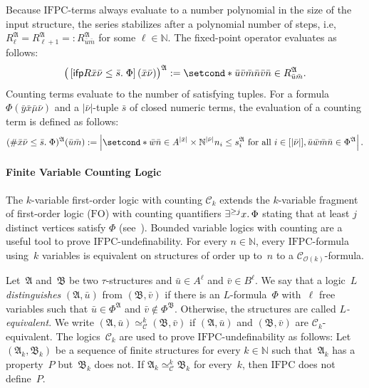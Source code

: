 \documentclass[]{lmcs}
\newcommand{\nat}{\mathbb{N}}
\newcommand{\defining}[1]{\emph{#1}}
\newcommand{\qspace}{\mathchoice{\;}{\,}{}{}}
\newcommand{\numVarA}{\nu}
\newcommand{\numVarB}{\mu}
\newcommand{\uniVarA}{x}
\newcommand{\uniVarB}{y}
\newcommand{\varVec}[1]{\bar{#1}}
\newcommand{\numVarVA}{\varVec{\numVarA}}
\newcommand{\numVarVB}{\varVec{\numVarB}}
\newcommand{\uniVarVA}{\varVec{\uniVarA}}
\newcommand{\uniVarVB}{\varVec{\uniVarB}}
\newcommand{\termA}{s}
\newcommand{\formA}{\Phi}
\newcommand{\rel}{R}
\newcommand{\tup}[1]{\bar{#1}}
\newcommand{\Struct}{\mathfrak{A}}
\newcommand{\StructV}{A}
\newcommand{\vertA}{u}
\newcommand{\vertB}{v}
\newcommand{\vertC}{w}
\newcommand{\StructA}{\mathfrak{A}}
\newcommand{\StructB}{\mathfrak{B}}
\newcommand{\StructVA}{A}
\newcommand{\StructVB}{B}
\newcommand{\sig}{\tau}
\newcommand{\FO}{\ensuremath{\mathrm{FO}}}
\newcommand{\IFPC}{\ensuremath{\mathrm{IFPC}}}
\newcommand{\Ck}[1]{\mathcal{C}_{#1}}
\newcommand{\ifp}{\mathsf{ifp}}
\newcommand{\kequiv}[1]{\simeq^#1_{\mathcal{C}}}
\begin{document}
Because \IFPC{}-terms always evaluate to a number polynomial in the size of the input structure,
the series stabilizes after a polynomial number of steps, i.e, $\rel_\ell^\Struct = \rel_{\ell+1}^\Struct =: \rel^\Struct_{\tup{\vertA}\tup{m}}$ for some $\ell \in \nat$.
The fixed-point operator evaluates as follows:
\[ \eval{\Struct}{\big(\left[\ifp \rel \uniVarVA\numVarVA \leq \tup{\termA}.\qspace\formA \right](\uniVarVA\numVarVA)\big)} := \setcond*{\tup{\vertA}\tup{\vertB}\tup{m}\tup{n}}{ \tup{\vertB}\tup{n} \in  \rel_{\tup{\vertA} \tup{m}}^\Struct}.\]
Counting terms evaluate to the number of satisfying tuples.
For a formula $\formA(\uniVarVB\uniVarVA\numVarVB\numVarVA)$
and a $|\numVarVA|$-tuple $\tup{\termA}$ of closed numeric terms,
the evaluation of a counting term  is defined as follows:
\[\eval{\Struct}{(\#\uniVarVA\numVarVA \leq \tup{\termA}.\qspace\formA)}(\tup{\vertA}\tup{m}) := \left|\setcond*{\tup{\vertC}\tup{n} \in \StructV^{|\uniVarVA|} \times \nat^{|\numVarVA|}}{n_i \leq \termA_i^\StructA \text{ for all } i \in [|\numVarVA|] , \tup{\vertA}\tup{\vertC}\tup{m}\tup{n} \in \eval{\Struct}{\formA}}\right|.\]




\paragraph{Finite Variable Counting Logic}
The $k$-variable first-order logic with counting $\Ck{k}$ 
extends the $k$-variable fragment of first-order logic (\FO{}) with counting quantifiers $\exists^{\geq j} \uniVarA.\qspace\formA$
stating that at least $j$ distinct vertices satisfy $\formA$ (see~\cite{Otto1997}).
Bounded variable logics with counting are a useful tool to prove
\IFPC{}-undefinability.
For every $n \in \nat$,
every \IFPC{}-formula using~$k$ variables
is equivalent on structures of order up to~$n$
to a $\Ck{\mathcal{O}(k)}$-formula.

Let~$\StructA$ and~$\StructB$ be two $\sig$-structures and $\tup{\vertA} \in \StructVA^\ell$ and $\tup{\vertB}\in\StructVB^\ell$.
We say that a logic~$L$ \defining{distinguishes} $(\StructA,\tup{\vertA})$
from $(\StructB,\tup{\vertB})$ if there is an $L$-formula~$\formA$ with~$\ell$ free variables such that ${\tup{\vertA} \in \formA^\StructA}$ and ${\tup{\vertB}\notin \formA^\StructB}$. 
Otherwise, the structures are called \defining{$L$-equivalent}.
We write $(\StructA,\tup{\vertA})\kequiv{k} (\StructB,\tup{\vertB})$
if $(\StructA,\tup{\vertA})$ and $(\StructB,\tup{\vertB})$ are $\Ck{k}$-equivalent.
The logics~$\Ck{k}$ are used to prove \IFPC{}-undefinability as follows:
Let $(\StructA_k, \StructB_k)$ be a sequence of finite structures for every $k \in \nat$
such that~$\StructA_k$ has a property~$P$ but~$\StructB_k$ does not.
If $\StructA_k \kequiv{k} \StructB_k$ for every~$k$, then \IFPC{} does not define~$P$.
\end{document}
